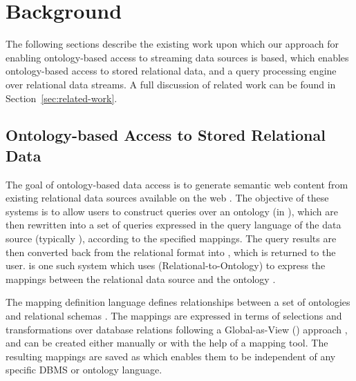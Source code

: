 
\section{Background}
\label{sec:background}

The following sections describe the existing work upon which our approach for enabling ontology-based access to streaming data sources is based, \viz \rtwoo which enables ontology-based access to stored relational data, and \snee a query processing engine over relational data streams.
A full discussion of related work can be found in Section~\ref{sec:related-work}.


\subsection{Ontology-based Access to Stored Relational Data}
\label{sec:ontol-based-access-stored}

The goal of ontology-based data access is to generate semantic web content from existing relational data sources available on the web \cite{Sahoo_09}.
The objective of these systems is to allow users to construct queries over an ontology (\eg in \sparql), which are then rewritten into a set of queries expressed in the query language of the data source (typically \sql), according to the specified mappings. 
The query results are then converted back from the relational format into \rdf, which is returned to the user.
\odemapster is one such system which uses \rtwoo (Relational-to-Ontology) to express the mappings between the relational data source and the ontology \cite{Barrasa_04}.

The mapping definition language \rtwoo defines relationships between a set of ontologies and relational schemas \cite{Barrasa_04}. 
The mappings are expressed in terms of selections and transformations over database relations following a Global-as-View (\gav) approach \cite{Lenzerini_02}, and can be created either manually or with the help of a mapping tool.
The resulting mappings are saved as \xml which enables them to be independent of any specific DBMS or ontology language.

